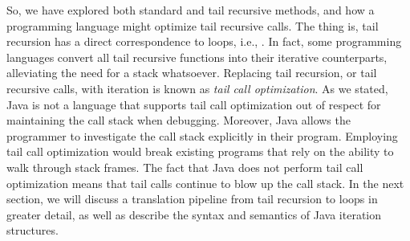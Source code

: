 So, we have explored both standard and tail recursive methods, and how a programming language might optimize tail recursive calls. 
The thing is, tail recursion has a direct correspondence to loops, i.e., . 
In fact, some programming languages convert all tail recursive functions into their iterative counterparts, alleviating the need for a stack whatsoever.
Replacing tail recursion, or tail recursive calls, with iteration is known as \emph{tail call optimization}.
As we stated, Java is not a language that supports tail call optimization out of respect for maintaining the call stack when debugging.
Moreover, Java allows the programmer to investigate the call stack explicitly in their program.
Employing tail call optimization would break existing programs that rely on the ability to walk through stack frames.
The fact that Java does not perform tail call optimization means that tail calls continue to blow up the call stack.
In the next section, we will discuss a translation pipeline from tail recursion to loops in greater detail, as well as describe the syntax and semantics of Java iteration structures.

  
  
  
  
  
